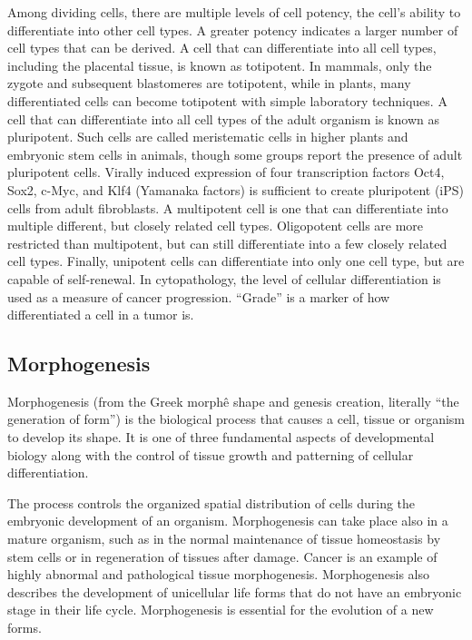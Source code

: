 Among dividing cells, there are multiple levels of cell potency, the cell's ability to differentiate into other cell types. A greater potency indicates a larger number of cell types that can be derived. A cell that can differentiate into all cell types, including the placental tissue, is known as totipotent. In mammals, only the zygote and subsequent blastomeres are totipotent, while in plants, many differentiated cells can become totipotent with simple laboratory techniques. A cell that can differentiate into all cell types of the adult organism is known as pluripotent. Such cells are called meristematic cells in higher plants and embryonic stem cells in animals, though some groups report the presence of adult pluripotent cells. Virally induced expression of four transcription factors Oct4, Sox2, c-Myc, and Klf4 (Yamanaka factors) is sufficient to create pluripotent (iPS) cells from adult fibroblasts. A multipotent cell is one that can differentiate into multiple different, but closely related cell types. Oligopotent cells are more restricted than multipotent, but can still differentiate into a few closely related cell types. Finally, unipotent cells can differentiate into only one cell type, but are capable of self-renewal. In cytopathology, the level of cellular differentiation is used as a measure of cancer progression. ``Grade'' is a marker of how differentiated a cell in a tumor is.

\hypertarget{morphogenesis}{%
\subsection{Morphogenesis}\label{morphogenesis}}

Morphogenesis (from the Greek morphê shape and genesis creation, literally ``the generation of form'') is the biological process that causes a cell, tissue or organism to develop its shape. It is one of three fundamental aspects of developmental biology along with the control of tissue growth and patterning of cellular differentiation.

The process controls the organized spatial distribution of cells during the embryonic development of an organism. Morphogenesis can take place also in a mature organism, such as in the normal maintenance of tissue homeostasis by stem cells or in regeneration of tissues after damage. Cancer is an example of highly abnormal and pathological tissue morphogenesis. Morphogenesis also describes the development of unicellular life forms that do not have an embryonic stage in their life cycle. Morphogenesis is essential for the evolution of a new forms.

